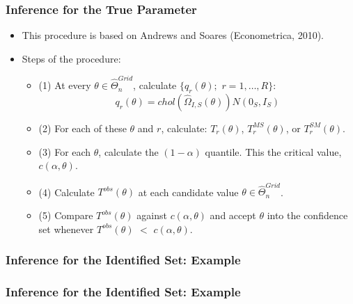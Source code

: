 \begin{frame}
\frametitle{Inference for the True Parameter}

\begin{itemize}
	\item This procedure is based on Andrews and Soares (Econometrica, 2010).
	\item Steps of the procedure:
	\begin{itemize}
		\item (1) At every $\theta\in\widehat{\Theta}_{n}^{Grid}$, calculate $\{q_{r}(\theta);$ $r=1,\dots,R\}$:
		\begin{equation*}
		q_{r}(\theta)=chol(\widehat{\Omega}_{I,S}(\theta))N(0_{S},I_{S})
		\end{equation*}
		\item (2) For each of these $\theta$ and $r$, calculate: $T_{r}(\theta)$, $T_{r}^{MS}(\theta)$, or $T_{r}^{SM}(\theta)$.
		\item (3) For each $\theta$, calculate the $(1-\alpha)$ quantile. This the critical value, $c(\alpha,\theta)$.
		\item (4) Calculate $T^{obs}(\theta)$ at each candidate value $\theta\in\widehat{\Theta}_{n}^{Grid}$.
		\item (5) Compare $T^{obs}(\theta)$ against $c(\alpha,\theta)$ and accept $\theta$ into the confidence set whenever $T^{obs}(\theta)$ $<$ $c(\alpha,\theta)$.
	\end{itemize}
\end{itemize}
\end{frame}
\begin{frame}
\frametitle{Inference for the Identified Set: Example}

\begin{figure}[h!]
\begin{center}
\end{center}
\end{figure}	
\end{frame}
\begin{frame}
\frametitle{Inference for the Identified Set: Example}

\begin{figure}[h!]
\begin{center}
\end{center}
\end{figure}	
\end{frame}
